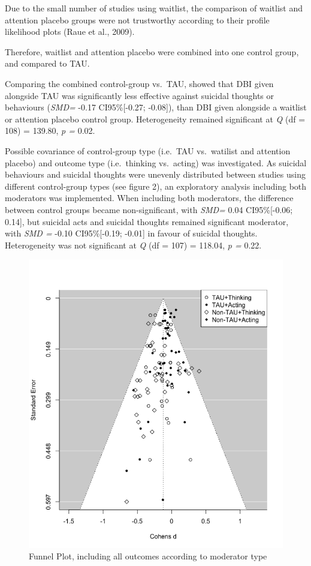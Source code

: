 \documentclass[
  english,
  man]{apa6}
\begin{document}
Due to the small number of studies using waitlist, the comparison of waitlist and attention placebo groups were not trustworthy according to their profile likelihood plots (Raue et al., 2009).

Therefore, waitlist and attention placebo were combined into one control group, and compared to TAU.

Comparing the combined control-group vs.~TAU, showed that DBI given alongside TAU was significantly less effective against suicidal thoughts or behaviours (\emph{SMD=} -0.17 CI95\%{[}-0.27; -0.08{]}), than DBI given alongside a waitlist or attention placebo control group. Heterogeneity remained significant at \emph{Q} (df = 108) = 139.80, \emph{p =} 0.02.

Possible covariance of control-group type (i.e.~TAU vs.~watilist and attention placebo) and outcome type (i.e.~thinking vs.~acting) was investigated. As suicidal behaviours and suicidal thoughts were unevenly distributed between studies using different control-group types (see figure 2), an exploratory analysis including both moderators was implemented. When including both moderators, the difference between control groups became non-significant, with \emph{SMD=} 0.04 CI95\%{[}-0.06; 0.14{]}, but suicidal acts and suicidal thoughts remained significant moderator, with \emph{SMD =} -0.10 CI95\%{[}-0.19; -0.01{]} in favour of suicidal thoughts. Heterogeneity was not significant at \emph{Q} (df = 107) = 118.04, \emph{p =} 0.22.

\begin{figure}
\centering
\includegraphics{01_Plots_Tables/Funnel.plot.png}
\caption{Funnel Plot, including all outcomes according to moderator type}
\end{figure}
\end{document}
